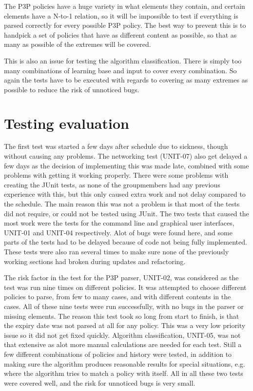 The P3P policies have a huge variety in what elements they contain, and certain elements have a N-to-1 relation, so it will be impossible to test if everything is parsed correctly for every possible P3P policy. The best way to prevent this is to handpick a set of policies that have as different content as possible, so that as many as possible of the extremes will be covered.

This is also an issue for testing the algorithm classification. There is simply too many combinations of learning base and input to cover every combination. So again the tests have to be executed with regards to covering as many extremes as possible to reduce the risk of unnoticed bugs.

\section{Testing evaluation}
The first test was started a few days after schedule due to sickness, though without causing any problems. The networking test (UNIT-07) also get delayed a few days as the decision of implementing this was made late, combined with some problems with getting it working properly. There were  some problems with creating the JUnit tests, as none of the groupmembers had any previous experience with this, but this only caused extra work and not delay compared to the schedule. The main reason this was not a problem is that most of the tests did not require, or could not be tested using JUnit. The two tests that caused the most work were the tests for the command line and graphical user interfaces, UNIT-01 and UNIT-04 respectively. Alot of bugs were found here, and some parts of the tests had to be delayed because of code not being fully implemented. These tests were also ran several times to make sure none of the previously working sections had broken during updates and refactoring.

The risk factor in the test for the P3P parser, UNIT-02, was considered as the test was run nine times on different policies. It was attempted to choose different policies to parse, from few to many cases, and with different contents in the cases. All of these nine tests were run successfully, with no bugs in the parser or missing elements. The reason this test took so long from start to finish, is that the expiry date was not parsed at all for any policy. This was a very low priority issue so it did not get fixed quickly.
Algorithm classification, UNIT-05, was not that extensive as alot more manual calculations are needed for each test. Still a few different combinations of policies and history were tested, in addition to making sure the algorithm produces reasonable results for special situations, e.g. where the algorithm tries to match a policy with itself.
All in all these two tests were covered well, and the risk for unnoticed bugs is very small.
